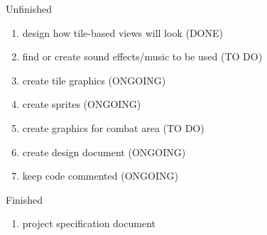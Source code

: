 \documentclass[12pt]{article}
\begin{document}
\begin{section}{Unfinished}
\begin{enumerate}
\item design how tile-based views will look (DONE)
\item find or create sound effects/music to be used (TO DO)
\item create tile graphics (ONGOING)
\item create sprites (ONGOING)
\item create graphics for combat area (TO DO)

\item create design document (ONGOING)
\item keep code commented (ONGOING)


\end{enumerate}
\end{section}

\begin{section}{Finished}
\begin{enumerate}

\item project specification document

\end{enumerate}
\end{section}
\end{document}
